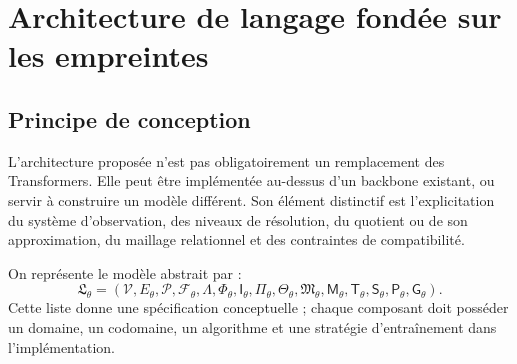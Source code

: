 \documentclass[11pt,a4paper]{article}
\theoremstyle{remark}
\newcommand{\V}{\mathcal V}
\newcommand{\Pctx}{\mathcal P}
\newcommand{\F}{\mathcal F}
\newcommand{\Lam}{\Lambda}
\newcommand{\Emp}{\mathsf I}
\newcommand{\Mem}{\mathsf M}
\newcommand{\Pred}{\mathsf P}
\newcommand{\Gen}{\mathsf G}
\newcommand{\Search}{\mathsf S}
\newcommand{\Trans}{\mathsf T}
\newcommand{\Thresh}{\Theta}
\newcommand{\1}{\mathbf 1}
\begin{document}
\section{Architecture de langage fondée sur les empreintes}

\subsection{Principe de conception}
L'architecture proposée n'est pas obligatoirement un remplacement des Transformers. Elle peut être implémentée au-dessus d'un backbone existant, ou servir à construire un modèle différent. Son élément distinctif est l'explicitation du système d'observation, des niveaux de résolution, du quotient ou de son approximation, du maillage relationnel et des contraintes de compatibilité.

On représente le modèle abstrait par :
\[
\mathfrak L_\theta=(\V,E_\theta,\Pctx,\F_\theta,\Lam,\Phi_\theta,\Emp_\theta,
\Pi_\theta,\Thresh_\theta,\mathfrak M_\theta,\Mem_\theta,\Trans_\theta,\Search_\theta,\Pred_\theta,\Gen_\theta).
\]
Cette liste donne une spécification conceptuelle ; chaque composant doit posséder un domaine, un codomaine, un algorithme et une stratégie d'entraînement dans l'implémentation.
\end{document}
